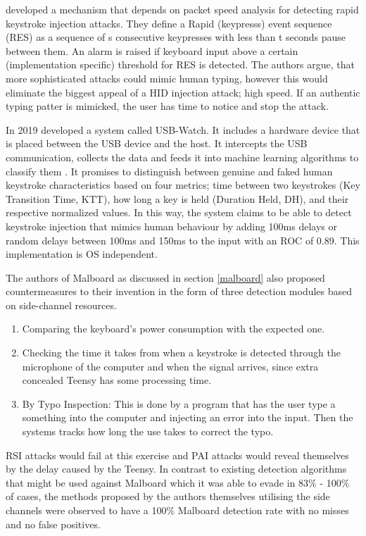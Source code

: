\cite{neunerUSBlockBlockingUSBBased2018} developed a mechanism that depends on packet speed analysis for detecting rapid keystroke injection attacks. They define a Rapid (keypresss) event sequence (RES) as a sequence of s consecutive keypresses with less than t seconds pause between them. An alarm is raised if keyboard input above a certain (implementation specific) threshold for RES is detected. The authors argue, that more sophisticated attacks could mimic human typing, however this would eliminate the biggest appeal of a HID injection attack; high speed. If an authentic typing patter is mimicked, the user has time to notice and stop the attack.

In 2019 \cite{denneyUSBWatchDynamicHardwareAssisted2019} developed a system called USB-Watch. It includes a hardware device that is placed between the USB device and the host. It intercepts the USB communication, collects the data and feeds it into machine learning algorithms to classify them . It promises to distinguish between genuine and faked human keystroke characteristics based on four metrics; time between two keystrokes (Key Transition Time, KTT), how long a key is held (Duration Held, DH), and their respective normalized values. In this way, the system claims to be able to detect keystroke injection that mimics human behaviour by adding 100ms delays or random delays between 100ms and 150ms to the input with an ROC of 0.89. This implementation is OS independent.

The authors of Malboard \cite{farhiMalboardNovelUser2019} as discussed in section \ref{malboard} also proposed countermeasures to their invention in the form of three detection modules based on side-channel resources. 
\begin{enumerate}
    \item Comparing the keyboard's power consumption with the expected one.
    \item Checking the time it takes from when a keystroke is detected through the microphone of the computer and when the signal arrives, since extra  concealed Teensy has some processing time.
    \item By Typo Inspection: This is done by a program that has the user type a something into the computer and injecting an error into the input. Then the systems tracks how long the use takes to correct the typo.
\end{enumerate}
RSI attacks would fail at this exercise and PAI attacks would reveal themselves by the delay caused by the Teensy.   
In contrast to existing detection algorithms that might be used against Malboard which it was able to evade in 83\% - 100\% of cases, the methods proposed by the authors themselves utilising the side channels were observed to have a 100\% Malboard detection rate with no misses and no false positives.  

